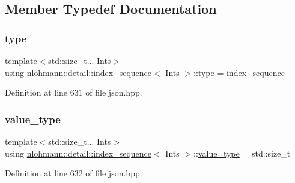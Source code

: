 \subsection{Member Typedef Documentation}
\mbox{\label{structnlohmann_1_1detail_1_1index__sequence_a3c14c4ab277de72b166806193ff4fa10}} 
\subsubsection{\texorpdfstring{type}{type}}
{\footnotesize\ttfamily template$<$std\+::size\+\_\+t... Ints$>$ \\
using \mbox{\hyperlink{structnlohmann_1_1detail_1_1index__sequence}{nlohmann\+::detail\+::index\+\_\+sequence}}$<$ Ints $>$\+::\mbox{\hyperlink{structnlohmann_1_1detail_1_1index__sequence_a3c14c4ab277de72b166806193ff4fa10}{type}} =  \mbox{\hyperlink{structnlohmann_1_1detail_1_1index__sequence}{index\+\_\+sequence}}}



Definition at line 631 of file json.\+hpp.

\mbox{\label{structnlohmann_1_1detail_1_1index__sequence_a2eca43d08fc1eb68bd5fa75b6714d21d}} 
\subsubsection{\texorpdfstring{value\_type}{value\_type}}
{\footnotesize\ttfamily template$<$std\+::size\+\_\+t... Ints$>$ \\
using \mbox{\hyperlink{structnlohmann_1_1detail_1_1index__sequence}{nlohmann\+::detail\+::index\+\_\+sequence}}$<$ Ints $>$\+::\mbox{\hyperlink{structnlohmann_1_1detail_1_1index__sequence_a2eca43d08fc1eb68bd5fa75b6714d21d}{value\+\_\+type}} =  std\+::size\+\_\+t}



Definition at line 632 of file json.\+hpp.



